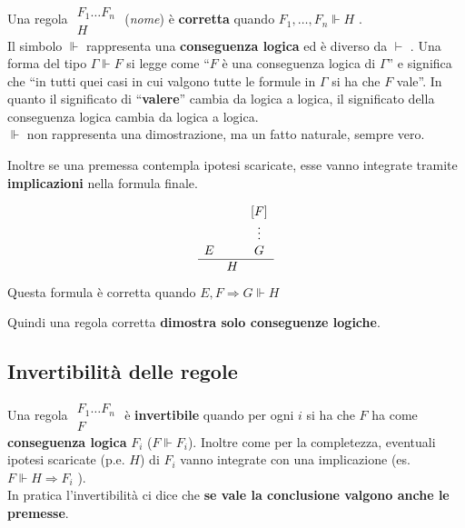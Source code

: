 \documentclass[
  a4paper,
]{article}
\begin{document}
Una regola \(\begin{matrix} F_1 \dots F_n \\\hline H\end{matrix}\)
(\emph{nome}) è \textbf{corretta} quando \(F_1, \dots , F_n \Vdash H\)
.\\
Il simbolo \(\Vdash\) rappresenta una \textbf{conseguenza logica} ed è
diverso da \(\vdash\) . Una forma del tipo \(\Gamma \Vdash F\) si legge
come ``\(F\) è una conseguenza logica di \(\Gamma\)'' e significa che
``in tutti quei casi in cui valgono tutte le formule in \(\Gamma\) si ha
che \(F\) vale''. In quanto il significato di ``\textbf{valere}'' cambia
da logica a logica, il significato della conseguenza logica cambia da
logica a logica.\\
\(\Vdash\) non rappresenta una dimostrazione, ma un fatto naturale,
sempre vero.

Inoltre se una premessa contempla ipotesi scaricate, esse vanno
integrate tramite \textbf{implicazioni} nella formula finale.

\begin{examplebox}[Esempio]

\[
\begin{matrix} 
&&[F] \\
&&\vdots \\
E && G \\
\hline
& H 
\end{matrix}
\] Questa formula è corretta quando \(E, F \Rightarrow G \Vdash H\)

\end{examplebox}

Quindi una regola corretta \textbf{dimostra solo conseguenze logiche}.

\hypertarget{invertibilituxe0-delle-regole}{%
\subsection{Invertibilità delle
regole}\label{invertibilituxe0-delle-regole}}

Una regola \(\begin{matrix} F_1 \dots F_n \\\hline F\end{matrix}\) è
\textbf{invertibile} quando per ogni \(i\) si ha che \(F\) ha come
\textbf{conseguenza logica} \(F_i\) (\(F \Vdash F_i\)). Inoltre come per
la completezza, eventuali ipotesi scaricate (p.e. \(H\)) di \(F_i\)
vanno integrate con una implicazione (es. \(F \Vdash H \Rightarrow F_i\)
).\\
In pratica l'invertibilità ci dice che \textbf{se vale la conclusione
valgono anche le premesse}.
\end{document}
